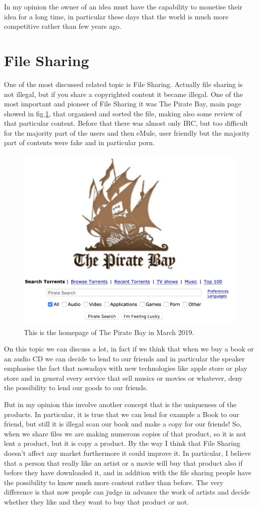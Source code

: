 \documentclass{article}
\begin{document}
    In my opinion the owner of an idea must have the capability to monetise their idea for a long time, in particular these days that the world is much more competitive rather than few years ago.
    
\section{File Sharing}
    One of the most discussed related topic is File Sharing. Actually file sharing is not illegal, but if you share a copyrighted content it became illegal. One of the most important and pioneer of File Sharing it was The Pirate Bay, main page showed in fig.\ref{fig:piratebay}, that organised and sorted the file, making also some review of that particular content. Before that there was almost only IRC, but too difficult for the majority part of the users and then eMule, user friendly but the majority part of contents were fake and in particular porn.
    \begin{figure}
        \centering
        \includegraphics[width=0.5\linewidth]{piratebay.png}
        \caption{This is the homepage of The Pirate Bay in March 2019.}
        \label{fig:piratebay}
    \end{figure}
    
    On this topic we can discuss a lot, in fact if we think that when we buy a book or an audio CD we can decide to lend to our friends and in particular the speaker emphasise the fact that nowadays with new technologies like apple store or play store and in general every service that sell musics or movies or whatever, deny the possibility to lend our goods to our friends.
    
    But in my opinion this involve another concept that is the uniqueness of the products. In particular, it is true that we can lend for example a Book to our friend, but still it is illegal scan our book and make a copy for our friends! So, when we share files we are making numerous copies of that product, so it is not lent a product, but it is copy a product. By the way I think that File Sharing doesn't affect any market furthermore it could improve it. In particular, I believe that a person that really like an artist or a movie will buy that product also if before they have downloaded it, and in addition with the file sharing people have the possibility to know much more content rather than before. The very difference is that now people can judge in advance the work of artists and decide whether they like and they want to buy that product or not.
\end{document}
